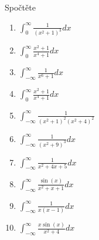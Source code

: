 \begin{multicols}{2}
Spočtěte
\begin{enumerate}
\item $\int_0^\infty \frac{1}{(x^2 + 1)^3} dx$
\item $\int_0^\infty \frac{x^2 + 1}{x^4 + 1} dx$
\item $\int_{-\infty}^\infty \frac{1}{x^6 + 1} dx$
\item $\int_0^\infty \frac{x^2 + 1}{x^4 + 1} dx$
\item $\int_{-\infty}^\infty \frac{1}{\left( x^2 + 1 \right)^2 \left( x^2 + 4 \right)^2}$
\item $\int_{-\infty}^\infty \frac{1}{(x^2 + 9)^3} dx$
\item $\int_{-\infty}^\infty \frac{1}{x^2 + 4x + 5} dx$
\item $\int_{-\infty}^\infty \frac{\sin (x)}{x^2 + x + 1} dx$
\item $\int_{-\infty}^\infty \frac{1}{x(x-1)} dx$
\item $\int_{-\infty}^\infty \frac{x \sin (x)}{x^2 + 4} dx$
\end{enumerate}

\end{multicols}
